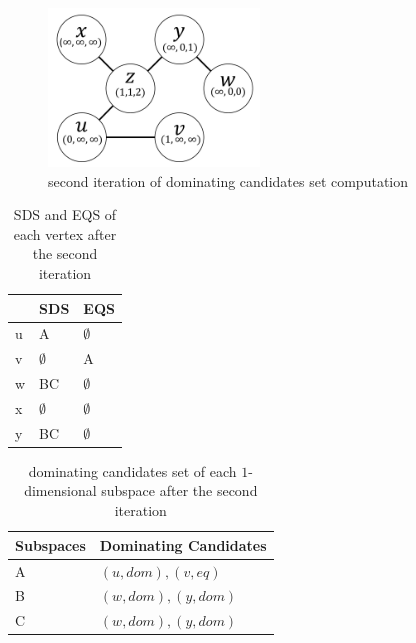 \begin{figure}[h]
    \centering
    \includegraphics[width=0.5\textwidth]{figs/graph_example_2}
    \caption{\label{font-figure}second iteration of dominating candidates set computation}
    \label{fig:cand_step2}
\end{figure}

\begin{table}[h]
    \centering

    \begin{tabular}{|l|l|l|}
    \hline
      & SDS         & EQS         \\ \hline
    u & A           & $\emptyset$ \\ \hline
    v & $\emptyset$ & A           \\ \hline
    w & BC          & $\emptyset$ \\ \hline
    x & $\emptyset$ & $\emptyset$ \\ \hline
    y & BC          & $\emptyset$ \\ \hline
    \end{tabular}
    \caption{\label{font-table}SDS and EQS of each vertex after the second iteration}
\end{table}

\begin{table}[h]
    \centering

    \begin{tabular}{|l|l|}
    \hline
    Subspaces & Dominating Candidates \\ \hline
    A         & $(u, dom), (v, eq)$            \\ \hline
    B         & $(w, dom), (y, dom)$            \\ \hline
    C         & $(w, dom), (y, dom)$            \\ \hline
    \end{tabular}
    \caption{\label{font-table}dominating candidates set of each $1$-dimensional subspace after the second iteration}
\end{table}

